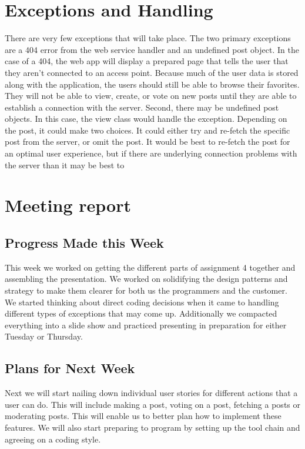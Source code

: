\documentclass[12pt]{article}
\begin{document}
\section{Exceptions and Handling}

There are very few exceptions that will take place.  The two primary exceptions are a 404 error from the web service handler and an undefined post object.  In the case of a 404, the web app will display a prepared page that tells the user that they aren't connected to an access point.  Because much of the user data is stored along with the application, the users should still be able to browse their favorites.  They will not be able to view, create, or vote on new posts until they are able to establish a connection with the server.  Second, there may be undefined post objects.  In this case, the view class would handle the exception.  Depending on the post, it could make two choices.  It could either try and re-fetch the specific post from the server, or omit the post.  It would be best to re-fetch the post for an optimal user experience, but if there are underlying connection problems with the server than it may be best to  

\section{Meeting report}

\subsection{Progress Made this Week}

This week we worked on getting the different parts of assignment 4 together and assembling the presentation.  We worked on solidifying the design patterns and strategy to make them clearer for both us the programmers and the customer.  We started thinking about direct coding decisions when it came to handling different types of exceptions that may come up.  Additionally we compacted everything into a slide show and practiced presenting in preparation for either Tuesday or Thursday.

\subsection{Plans for Next Week}

Next we will start nailing down individual user stories for different actions that a user can do.  This will include making a post, voting on a post, fetching a posts or moderating posts.  This will enable us to better plan how to implement these features.  We will also start preparing to program by setting up the tool chain and agreeing on a coding style.
\end{document}
